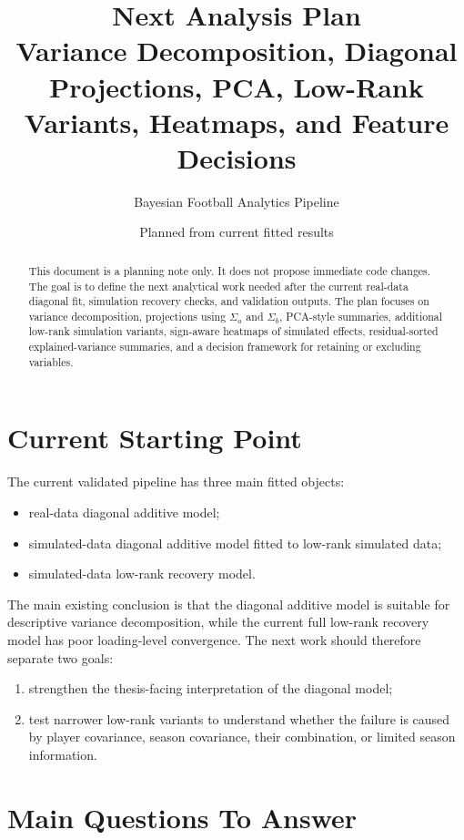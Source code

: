 \documentclass[11pt]{article}
\title{\textbf{Next Analysis Plan}\\
\large Variance Decomposition, Diagonal Projections, PCA, Low-Rank Variants, Heatmaps, and Feature Decisions}
\author{Bayesian Football Analytics Pipeline}
\date{Planned from current fitted results}
\newcommand{\code}[1]{\texttt{\detokenize{#1}}}
\begin{document}
\maketitle

\begin{abstract}
This document is a planning note only. It does not propose immediate code
changes. The goal is to define the next analytical work needed after the
current real-data diagonal fit, simulation recovery checks, and validation
outputs. The plan focuses on variance decomposition, projections using
\(\Sigma_a\) and \(\Sigma_b\), PCA-style summaries, additional low-rank
simulation variants, sign-aware heatmaps of simulated effects, residual-sorted
explained-variance summaries, and a decision framework for retaining or
excluding \code{rate_*} variables.
\end{abstract}

\section{Current Starting Point}

The current validated pipeline has three main fitted objects:

\begin{itemize}[leftmargin=*]
  \item real-data diagonal additive model;
  \item simulated-data diagonal additive model fitted to low-rank simulated data;
  \item simulated-data low-rank recovery model.
\end{itemize}

The main existing conclusion is that the diagonal additive model is suitable
for descriptive variance decomposition, while the current full low-rank
recovery model has poor loading-level convergence. The next work should
therefore separate two goals:

\begin{enumerate}[leftmargin=*]
  \item strengthen the thesis-facing interpretation of the diagonal model;
  \item test narrower low-rank variants to understand whether the failure is
  caused by player covariance, season covariance, their combination, or limited
  season information.
\end{enumerate}

\section{Main Questions To Answer}
\end{document}
